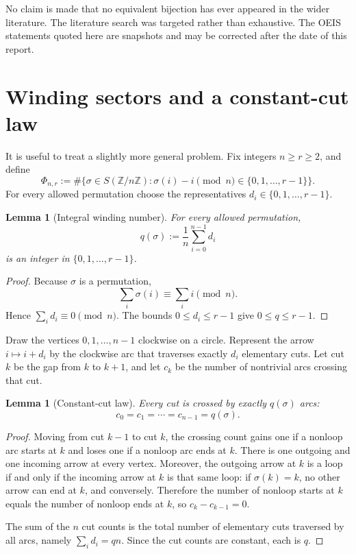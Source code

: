 \documentclass[11pt,letterpaper]{article}
\numberwithin{equation}{section}
\newtheorem{lemma}[theorem]{Lemma}
\theoremstyle{definition}
\newcommand{\Z}{\mathbb Z}
\newcommand{\Zn}{\Z/n\Z}
\begin{document}
No claim is made that no equivalent bijection has ever appeared in the wider
literature.  The literature search was targeted rather than exhaustive.  The
OEIS statements quoted here are snapshots and may be corrected after the date
of this report.

\section{Winding sectors and a constant-cut law}\label{wdc:sec:winding}

It is useful to treat a slightly more general problem.  Fix integers
$n\ge r\ge2$, and define
\begin{equation}\label{wdc:eq:Phi-nr}
  \Phi_{n,r}
  :=\#\bigl\{\sigma\in S(\Zn):
       \sigma(i)-i\pmod n\in\{0,1,\dots,r-1\}\bigr\}.
\end{equation}
For every allowed permutation choose the representatives
$d_i\in\{0,1,\dots,r-1\}$.

\begin{lemma}[Integral winding number]\label{wdc:lem:winding-integral}
For every allowed permutation,
\begin{equation}\label{wdc:eq:q-def}
  q(\sigma):=\frac1n\sum_{i=0}^{n-1}d_i
\end{equation}
is an integer in $\{0,1,\dots,r-1\}$.
\end{lemma}

\begin{proof}
Because $\sigma$ is a permutation,
\[
 \sum_i\sigma(i)\equiv\sum_i i\pmod n.
\]
Hence $\sum_i d_i\equiv0\pmod n$.  The bounds
$0\le d_i\le r-1$ give $0\le q\le r-1$.
\end{proof}

Draw the vertices $0,1,\dots,n-1$ clockwise on a circle.  Represent the arrow
$i\mapsto i+d_i$ by the clockwise arc that traverses exactly $d_i$ elementary
cuts.  Let cut $k$ be the gap from $k$ to $k+1$, and let $c_k$ be the number
of nontrivial arcs crossing that cut.

\begin{lemma}[Constant-cut law]\label{wdc:lem:constant-cut}
Every cut is crossed by exactly $q(\sigma)$ arcs:
\begin{equation}\label{wdc:eq:constant-cut}
  c_0=c_1=\cdots=c_{n-1}=q(\sigma).
\end{equation}
\end{lemma}

\begin{proof}
Moving from cut $k-1$ to cut $k$, the crossing count gains one if a nonloop
arc starts at $k$ and loses one if a nonloop arc ends at $k$.  There is one
outgoing and one incoming arrow at every vertex.  Moreover, the outgoing arrow
at $k$ is a loop if and only if the incoming arrow at $k$ is that same loop:
if $\sigma(k)=k$, no other arrow can end at $k$, and conversely.  Therefore the
number of nonloop starts at $k$ equals the number of nonloop ends at $k$, so
$c_k-c_{k-1}=0$.

The sum of the $n$ cut counts is the total number of elementary cuts traversed
by all arcs, namely $\sum_i d_i=qn$.  Since the cut counts are constant, each
is $q$.
\end{proof}
\end{document}
